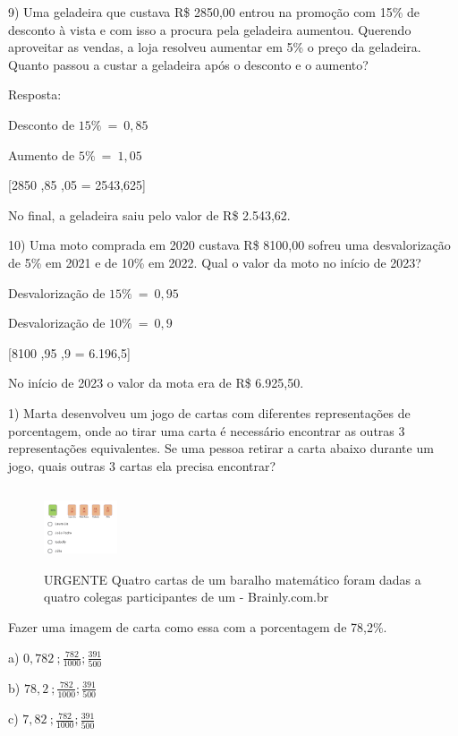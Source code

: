 9) Uma geladeira que custava R\$ 2850,00 entrou na promoção com 15\% de
desconto à vista e com isso a procura pela geladeira aumentou. Querendo
aproveitar as vendas, a loja resolveu aumentar em 5\% o preço da
geladeira. Quanto passou a custar a geladeira após o desconto e o
aumento?

Resposta:

Desconto de \(15\%\  = \ 0,85\)

Aumento de \(5\%\  = \ 1,05\)

[2850 ,85 ,05 = 2543,625]

No final, a geladeira saiu pelo valor de R\$ 2.543,62.

10) Uma moto comprada em 2020 custava R\$ 8100,00 sofreu uma
desvalorização de 5\% em 2021 e de 10\% em 2022. Qual o valor da moto no
início de 2023?

Desvalorização de \(15\%\  = \ 0,95\)

Desvalorização de \(10\%\  = \ 0,9\)

[8100 ,95 ,9 = 6.196,5]

No início de 2023 o valor da mota era de R\$ 6.925,50.


1) Marta desenvolveu um jogo de cartas com diferentes representações de
porcentagem, onde ao tirar uma carta é necessário encontrar as outras 3
representações equivalentes. Se uma pessoa retirar a carta abaixo
durante um jogo, quais outras 3 cartas ela precisa encontrar?

\begin{figure}
\centering
\includegraphics[width=0.85417in,height=0.92708in]{./imgSAEB_7_MAT/media/image16.jpg}
\caption{URGENTE Quatro cartas de um baralho matemático foram dadas a
quatro colegas participantes de um - Brainly.com.br}
\end{figure}

Fazer uma imagem de carta como essa com a porcentagem de 78,2\%.

a) \(0,782\ ;\frac{782}{1000};\frac{391}{500}\)

b) \(78,2\ ;\frac{782}{1000};\frac{391}{500}\)

c) \(7,82\ ;\frac{782}{1000};\frac{391}{500}\)

